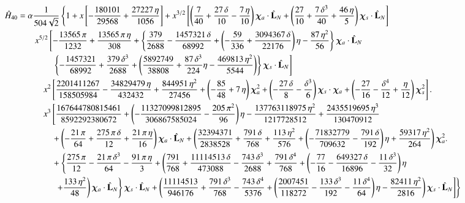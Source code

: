 \documentclass[prd,preprintnumbers,twocolumn,eqsecnum,floatfix,letter]{revtex4}
\begin{document}
\begin{widetext}
\begin{align}\label{eq:H40}
	\hat{H}_{40} &=\alpha\frac{1}{504\sqrt{2}}\left\{1 + x\left[-\frac{180101}{29568} + \frac{27227\,\eta}{1056}\right] + x^{3/2}\left[\left(\frac{7}{40} + \frac{27\,\delta}{10} -\frac{7\,\eta}{10}\right)\bm{\chi}_a \cdot \hat{\mathbf{L}}_N+\left(\frac{27}{10}+\frac{7\,\delta^3}{40} +\frac{46\,\eta}{5}\right)\bm{\chi}_s \cdot \hat{\mathbf{L}}_N\right]\right.\nonumber\\
	&\qquad x^{5/2}\left[-\frac{13565\,\pi}{1232} + \frac{13565\,\pi\,\eta}{308} + \left\{\frac{379}{2688}-\frac{1457321\,\delta}{68992}+\left(-\frac{59}{336} + \frac{3094367\,\delta}{22176}\right)\eta -\frac{87\,\eta^2}{56}\right\}\bm{\chi}_a \cdot \hat{\mathbf{L}}_N\right.\nonumber\\
	&\qquad\qquad \left. \left\{-\frac{1457321}{68992} + \frac{379\,\delta^3}{2688} + \left(\frac{5892749}{38808} + \frac{87\,\delta^3}{224}\eta-\frac{469813\,\eta^2}{5544}\right)\right\}\bm{\chi}_s \cdot \hat{\mathbf{L}}_N\right]\nonumber\\
	&\quad\qquad x^2\left[\frac{2201411267}{158505984} -\frac{34829479\,\eta}{432432} + \frac{844951\,\eta^2}{27456} + \left(-\frac{85}{48} + 7\,\eta\right)\bm{\chi}_a^2 + \left(-\frac{27\, \delta}{8} -\frac{\delta^3}{6}\right)\bm{\chi}_s \cdot \bm{\chi}_a + \left(-\frac{27}{16} -\frac{\delta^4}{12} + \frac{\eta}{12}\right)\bm{\chi}_s^2\right].\nonumber\\
	&\quad\qquad x^3\left[\frac{167644780815461}{8592292380672}+\left(-\frac{11327099812895}{306867585024} -\frac{205\,\pi^2}{96}\right)\eta -\frac{137763118975\,\eta^2}{1217728512} + \frac{2435519695\,\eta^3}{130470912}\right.\nonumber\\
	&\qquad\qquad  + \left(-\frac{21\,\pi}{64} + \frac{275\,\pi\,\delta}{12} + \frac{21\,\pi\,\eta}{16}\right)\bm{\chi}_a \cdot \hat{\mathbf{L}}_N + \left(\frac{32394371}{2838528} + \frac{791\,\delta}{768} + \frac{113\,\eta^2}{576} + \left(-\frac{71832779}{709632} -\frac{791\,\delta}{192}\right)\eta + \frac{59317\,\eta^2}{264}\right)\bm{\chi}_a^2 .\nonumber\\
	&\qquad\qquad + \left\{\frac{275\,\pi}{12} - \frac{21\,\pi\,\delta^3}{64} -\frac{91\,\pi\,\eta}{3} + \left(\frac{791}{768} + \frac{11114513\,\delta}{473088} -\frac{743\,\delta^3}{2688} + \frac{791\,\delta^4}{768} + \left(-\frac{77}{16} -\frac{649327\,\delta}{16896} -\frac{11\,\delta^3}{32}\right)\eta  \right.\right.\nonumber\\
	&\qquad\qquad \left.\left.\left. \left.+ \frac{133\,\eta^2}{48}\right)\bm{\chi}_a \cdot \hat{\mathbf{L}}_N\right\}\bm{\chi}_s \cdot \hat{\mathbf{L}}_N + \left(\frac{11114513}{946176} + \frac{791\,\delta^3}{768} -\frac{743\,\delta^4}{5376} + \left(\frac{2007451}{118272} -\frac{133\,\delta^3}{192} -\frac{11\,\delta^4}{64}\right)\eta - \frac{82411\,\eta^2}{2816}\right)\bm{\chi}_s \cdot \hat{\mathbf{L}}_N\right]\nonumber
	\right\}\\
\end{align}	


\end{widetext}
\end{document}
